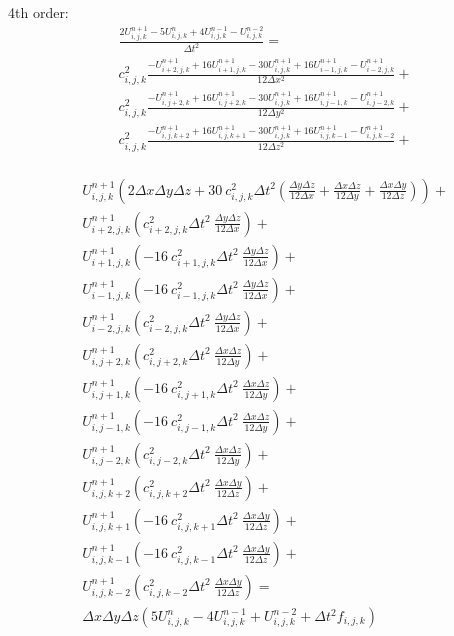 \documentclass[12pt,a4paper]{report}
\begin{document}
4th order:
\begin{equation}
\begin{aligned}
&\frac{2 U^{n+1}_{i,j,k} - 5 U^{n}_{i,j,k} + 4 U^{n-1}_{i,j,k} - U^{n-2}_{i,j,k}}{\Delta t^2} = \\
& c^2_{i,j,k} \frac{-U^{n+1}_{i+2,j,k} + 16 U^{n+1}_{i+1,j,k} - 30 U^{n+1}_{i,j,k} + 16 U^{n+1}_{i-1,j,k} - U^{n+1}_{i-2,j,k}}{12\Delta x^2} +\\
& c^2_{i,j,k} \frac{-U^{n+1}_{i,j+2,k} + 16 U^{n+1}_{i,j+2,k} - 30 U^{n+1}_{i,j,k} + 16 U^{n+1}_{i,j-1,k} - U^{n+1}_{i,j-2,k}}{12\Delta y^2} +\\
& c^2_{i,j,k} \frac{-U^{n+1}_{i,j,k+2} + 16 U^{n+1}_{i,j,k+1} - 30 U^{n+1}_{i,j,k} + 16 U^{n+1}_{i,j,k-1} - U^{n+1}_{i,j,k-2}}{12\Delta z^2} +\\
\end{aligned}
\end{equation}

\begin{equation}
\begin{aligned}
& U^{n+1}_{i,j,k} \left(2 \Delta x \Delta y \Delta z + 30\ c^2_{i,j,k} \Delta t^2 \left( \frac{\Delta y \Delta z}{12 \Delta x} + \frac{\Delta x \Delta z}{12 \Delta y}+ \frac{\Delta x \Delta y}{12 \Delta z}\right)\right) + \\
& U^{n+1}_{i+2,j,k}  \left(c^2_{i+2,j,k} \Delta t^2\ \frac{\Delta y \Delta z}{12 \Delta x}\right) + \\
& U^{n+1}_{i+1,j,k}  \left( -16\ c^2_{i+1,j,k} \Delta t^2\ \frac{\Delta y \Delta z}{12 \Delta x}\right) + \\
& U^{n+1}_{i-1,j,k}  \left( -16\ c^2_{i-1,j,k} \Delta t^2\ \frac{\Delta y \Delta z}{12 \Delta x}\right) + \\
& U^{n+1}_{i-2,j,k}  \left(c^2_{i-2,j,k} \Delta t^2\ \frac{\Delta y \Delta z}{12 \Delta x}\right) + \\
& U^{n+1}_{i,j+2,k}  \left(c^2_{i,j+2,k} \Delta t^2\ \frac{\Delta x \Delta z}{12 \Delta y}\right) + \\
& U^{n+1}_{i,j+1,k}  \left( -16\ c^2_{i,j+1,k} \Delta t^2\ \frac{\Delta x \Delta z}{12 \Delta y}\right) + \\
& U^{n+1}_{i,j-1,k}  \left( -16\ c^2_{i,j-1,k} \Delta t^2\ \frac{\Delta x \Delta z}{12 \Delta y}\right) + \\
& U^{n+1}_{i,j-2,k}  \left(c^2_{i,j-2,k} \Delta t^2\ \frac{\Delta x \Delta z}{12 \Delta y}\right) + \\
& U^{n+1}_{i,j,k+2}  \left(c^2_{i,j,k+2} \Delta t^2\ \frac{\Delta x \Delta y}{12 \Delta z}\right) + \\
& U^{n+1}_{i,j,k+1}  \left( -16\ c^2_{i,j,k+1} \Delta t^2\ \frac{\Delta x \Delta y}{12 \Delta z}\right) + \\
& U^{n+1}_{i,j,k-1}  \left( -16\ c^2_{i,j,k-1} \Delta t^2\ \frac{\Delta x \Delta y}{12 \Delta z}\right) + \\
& U^{n+1}_{i,j,k-2}  \left(c^2_{i,j,k-2} \Delta t^2\ \frac{\Delta x \Delta y}{12 \Delta z}\right) = \\
& \Delta x \Delta y \Delta z \left( 5 U^{n}_{i,j,k} - 4 U^{n-1}_{i,j,k} + U^{n-2}_{i,j,k} + \Delta t^2 f_{i,j,k} \right)
\end{aligned}
\end{equation}
\end{document}
